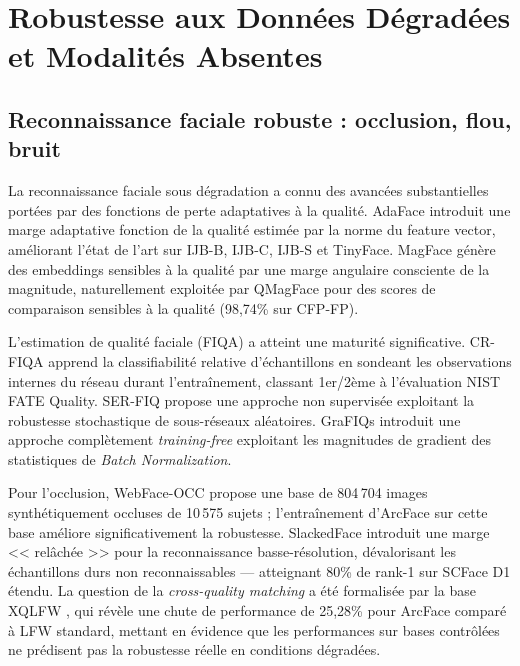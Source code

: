 \documentclass[12pt,a4paper]{report}
\begin{document}
\section{Robustesse aux Donn\'{e}es D\'{e}grad\'{e}es et Modalit\'{e}s Absentes}
\label{sec:robustesse}

\subsection{Reconnaissance faciale robuste : occlusion, flou, bruit}

La reconnaissance faciale sous d\'{e}gradation a connu des avanc\'{e}es substantielles port\'{e}es par des fonctions de perte adaptatives \`{a} la qualit\'{e}. AdaFace \cite{kim2022adaface} introduit une marge adaptative fonction de la qualit\'{e} estim\'{e}e par la norme du feature vector, am\'{e}liorant l'\'{e}tat de l'art sur IJB-B, IJB-C, IJB-S et TinyFace. MagFace \cite{meng2021magface} g\'{e}n\`{e}re des embeddings sensibles \`{a} la qualit\'{e} par une marge angulaire consciente de la magnitude, naturellement exploit\'{e}e par QMagFace \cite{terhorst2023qmagface} pour des scores de comparaison sensibles \`{a} la qualit\'{e} (98,74\% sur CFP-FP).

L'estimation de qualit\'{e} faciale (FIQA) a atteint une maturit\'{e} significative. CR-FIQA \cite{boutros2023crfiqa} apprend la classifiabilit\'{e} relative d'\'{e}chantillons en sondeant les observations internes du r\'{e}seau durant l'entra\^{i}nement, classant 1er/2\`{e}me \`{a} l'\'{e}valuation NIST FATE Quality. SER-FIQ \cite{terhorst2020serfiq} propose une approche non supervis\'{e}e exploitant la robustesse stochastique de sous-r\'{e}seaux al\'{e}atoires. GraFIQs \cite{kolf2024grafiqs} introduit une approche compl\`{e}tement \textit{training-free} exploitant les magnitudes de gradient des statistiques de \textit{Batch Normalization}.

Pour l'occlusion, WebFace-OCC \cite{huang2021webface} propose une base de 804\,704 images synth\'{e}tiquement occluses de 10\,575 sujets ; l'entra\^{i}nement d'ArcFace sur cette base am\'{e}liore significativement la robustesse. SlackedFace \cite{low2023slackedface} introduit une marge << rel\^{a}ch\'{e}e >> pour la reconnaissance basse-r\'{e}solution, d\'{e}valorisant les \'{e}chantillons durs non reconnaissables --- atteignant 80\% de rank-1 sur SCFace D1 \'{e}tendu. La question de la \textit{cross-quality matching} a \'{e}t\'{e} formalis\'{e}e par la base XQLFW \cite{knoche2021xqlfw}, qui r\'{e}v\`{e}le une chute de performance de 25,28\% pour ArcFace compar\'{e} \`{a} LFW standard, mettant en \'{e}vidence que les performances sur bases contr\^{o}l\'{e}es ne pr\'{e}disent pas la robustesse r\'{e}elle en conditions d\'{e}grad\'{e}es.
\end{document}
